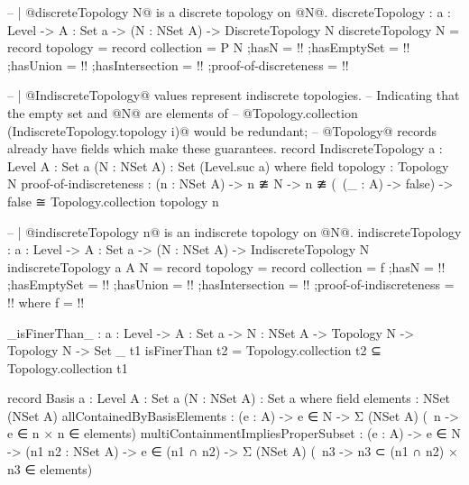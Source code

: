 \begin{code}
-- | @discreteTopology N@ is a discrete topology on @N@.
discreteTopology : {a : Level} -> {A : Set a} -> (N : NSet A) -> DiscreteTopology N
discreteTopology N = record
  {topology = record
     {collection = P N
     ;hasN = {!!}
     ;hasEmptySet = {!!}
     ;hasUnion = {!!}
     ;hasIntersection = {!!}
     }
  ;proof-of-discreteness = {!!}}

-- | @IndiscreteTopology@ values represent indiscrete topologies.
-- Indicating that the empty set and @N@ are elements of
-- @Topology.collection (IndiscreteTopology.topology i)@ would be redundant;
-- @Topology@ records already have fields which make these guarantees.
record IndiscreteTopology {a : Level}
                          {A : Set a}
                          (N : NSet A) : Set (Level.suc a) where
  field
    topology : Topology N
    proof-of-indiscreteness : (n : NSet A) ->
                              n ≇ N ->
                              n ≇ (\ (_ : A) -> false)
                              -> false ≅ Topology.collection topology n

-- | @indiscreteTopology n@ is an indiscrete topology on @N@.
indiscreteTopology : {a : Level} ->
                     {A : Set a} ->
                     (N : NSet A) ->
                     IndiscreteTopology N
indiscreteTopology {a} {A} N = record
  {topology = record
     {collection = f
     ;hasN = {!!}
     ;hasEmptySet = {!!}
     ;hasUnion = {!!}
     ;hasIntersection = {!!}
     }
  ;proof-of-indiscreteness = {!!}}
  where
  f = {!!}
  
_isFinerThan_ : {a : Level} ->
                {A : Set a} ->
                {N : NSet A} ->
                Topology N ->
                Topology N ->
                Set _
t1 isFinerThan t2 = Topology.collection t2 ⊆ Topology.collection t1

record Basis {a : Level}
             {A : Set a}
             (N : NSet A) : Set a where
  field
   elements : NSet (NSet A)
   allContainedByBasisElements :
     (e : A) ->
     e ∈ N ->
     Σ (NSet A) (\ n -> e ∈ n × n ∈ elements)
   multiContainmentImpliesProperSubset :
     (e : A) ->
     e ∈ N ->
     (n1 n2 : NSet A) ->
     e ∈ (n1 ∩ n2) ->
     Σ (NSet A) (\ n3 -> n3 ⊂ (n1 ∩ n2) × n3 ∈ elements)
\end{code}
